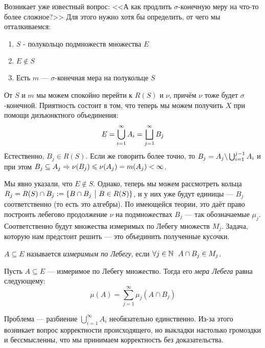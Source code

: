 \begin{note}
	Возникает уже известный вопрос: <<А как продлить $\sigma$-конечную меру на что-то более сложное?>> Для этого нужно хотя бы определить, от чего мы отталкиваемся:
	\begin{enumerate}
		\item $S$ - полукольцо подмножеств множества $E$
		
		\item $E \notin S$
		
		\item Есть $m$ --- $\sigma$-конечная мера на полукольце $S$
	\end{enumerate}
	От $S$ и $m$ мы можем спокойно перейти к $R(S)$ и $\nu$, причём $\nu$ тоже будет $\sigma$-конечной. Приятность состоит в том, что теперь мы можем получить $X$ при помощи дизъюнктного объединения:
	\[
		E = \bigcup_{i = 1}^\infty A_i = \bigsqcup_{j = 1}^\infty B_j
	\]
	Естественно, $B_j \in R(S)$. Если же говорить более точно, то $B_j = A_j \backslash \bigcup_{i = 1}^{j - 1} A_i$ и при этом $B_j \subseteq A_j \Rightarrow \nu(B_j) \leqslant \nu(A_j) = m(A_j) < \infty$.
	
	Мы явно указали, что $E \notin S$. Однако, теперь мы можем рассмотреть кольца $R_j = R(S) \cap B_j := \{B \cap B_j \ \big|\  B \in R(S)\}$, и у них уже будут единицы --- $B_j$ соответственно (то есть это алгебры). По имеющейся теории, это даёт право построить лебегово продолжение $\nu$ на подмножествах $B_j$ --- так обозначаемые $\mu_j$. Соответственно будут множества измеримых по Лебегу множеств $M_j$. Задача, которую нам предстоит решить --- это объединить полученные кусочки.
\end{note}

\begin{definition}
	$A \subseteq E$ называется \textit{измеримым по Лебегу}, если $\forall j \in \mathbb{N}\ \ A \cap B_j \in M_j$.
\end{definition}

\begin{definition}
	Пусть $A \subseteq E$ --- измеримое по Лебегу множество. Тогда его \textit{мера Лебега} равна следующему:
	\[
		\mu(A) = \sum_{j = 1}^\infty \mu_j(A \cap B_j)
	\]
\end{definition}

\begin{note}
	Проблема --- разбиение $\bigcup_{i = 1}^\infty A_i$ необязательно единственно. Из-за этого возникает вопрос корректности происходящего, но выкладки настолько громоздки и бессмысленны, что мы принимаем корректность без доказательства.
\end{note}

